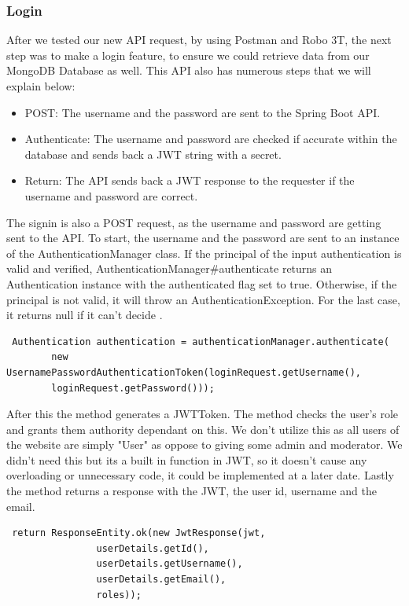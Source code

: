 \subsubsection{Login}
After we tested our new API request, by using Postman and Robo 3T, the next step was to make a login feature, to ensure we could retrieve data from our MongoDB Database as well. This API also has numerous steps that we will explain below: \par
\begin{itemize}
    \item POST: The username and the password are sent to the Spring Boot API.
    \item Authenticate: The username and password are checked if accurate within the database and sends back a JWT string with a secret.
    \item Return: The API sends back a JWT response to the requester if the username and password are correct.
\end{itemize}
The signin is also a POST request, as the username and password are getting sent to the API. To start, the username and the password are sent to an instance of the AuthenticationManager class. If the principal of the input authentication is valid and verified, AuthenticationManager#authenticate returns an Authentication instance with the authenticated flag set to true. Otherwise, if the principal is not valid, it will throw an AuthenticationException. For the last case, it returns null if it can't decide \cite{Baeldung}. \par
\begin{verbatim}
 Authentication authentication = authenticationManager.authenticate(
        new UsernamePasswordAuthenticationToken(loginRequest.getUsername(),
        loginRequest.getPassword())); 
\end{verbatim}
\par After this the method generates a JWTToken. The method checks the user's role and grants them authority dependant on this. We don't utilize this as all users of the website are simply "User" as oppose to giving some admin and moderator. We didn't need this but its a built in function in JWT, so it doesn't cause any overloading or unnecessary code, it could be implemented at a later date. Lastly the method returns a response with the JWT, the user id, username and the email.\par
\begin{verbatim}
 return ResponseEntity.ok(new JwtResponse(jwt,
                userDetails.getId(),
                userDetails.getUsername(),
                userDetails.getEmail(),
                roles));
\end{verbatim}


